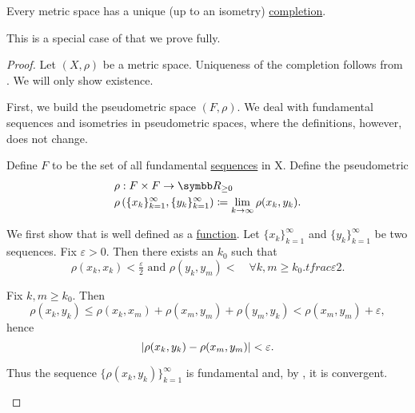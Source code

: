 \begin{theorem}\label{thm:metric_space_completion}
  Every metric space has a unique (up to an isometry) \hyperref[def:complete_metric_space]{completion}.

  This is a special case of  that we prove fully.
\end{theorem}
\begin{proof}
  Let \( (X, \rho) \) be a metric space. Uniqueness of the completion follows from . We will only show existence.

  \begin{defenum}
     First, we build the pseudometric space \( (F, \rho) \). We deal with fundamental sequences and isometries in pseudometric spaces, where the definitions, however, does not change.

     Define \( F \) to be the set of all fundamental \hyperref[def:fundamental_net]{sequences} in X. Define the pseudometric
    \begin{align*}
      &\rho: F \times F \to \BR_{\geq 0} \\
      &\rho\left( \{ x_k \}_{k=1}^\infty, \{ y_k \}_{k=1}^\infty \right) \coloneqq \lim_{k \to \infty} \rho(x_k, y_k).
    \end{align*}

    We first show that is well defined as a \hyperref[def:function]{function}. Let \( \{ x_k \}_{k=1}^\infty \) and \( \{ y_k \}_{k=1}^\infty \) be two sequences. Fix \( \varepsilon > 0 \). Then there exists an \( k_0 \) such that
    \begin{equation*}
      \rho(x_k, x_k) < \tfrac \varepsilon 2 \text{ and } \rho(y_k, y_m) <  \quad\forall k, m \geq k_0.tfrac \varepsilon 2.
    \end{equation*}

    Fix \( k, m \geq k_0 \). Then
    \begin{equation*}
      \rho(x_k, y_k) \leq \rho(x_k, x_m) + \rho(x_m, y_m) + \rho(y_m, y_k) < \rho(x_m, y_m) + \varepsilon,
    \end{equation*}
    hence
    \begin{equation*}
      \left\vert \rho(x_k, y_k) - \rho(x_m, y_m) \right\vert < \varepsilon.
    \end{equation*}

    Thus the sequence \( \{ \rho(x_k, y_k) \}_{k=1}^\infty \) is fundamental and, by , it is convergent.


\end{defenum}
\end{proof}
